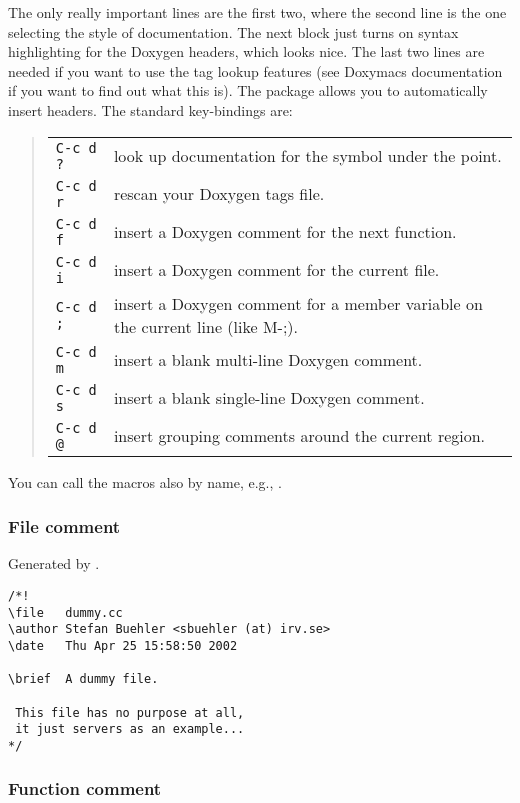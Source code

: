 The only really important lines are the first two, where the second
line is the one selecting the style of documentation. The next block
just turns on syntax highlighting for the Doxygen headers, which looks
nice. The last two lines are needed if you want to use the tag lookup
features (see Doxymacs documentation if you want to find out what this
is).  The package allows you to automatically insert headers. The
standard key-bindings are:
\begin{quote}
\begin{tabularx}{.8\hsize}{@{}lX}
\texttt{C-c d ?} & look up documentation for the symbol under the point.\\
\texttt{C-c d r} & rescan your Doxygen tags file.\\
\texttt{C-c d f} & insert a Doxygen comment for the next function.\\
\texttt{C-c d i} & insert a Doxygen comment for the current file.\\
\texttt{C-c d ;} & insert a Doxygen comment for a member variable on the current line (like M-;).\\
\texttt{C-c d m} & insert a blank multi-line Doxygen comment.\\
\texttt{C-c d s} & insert a blank single-line Doxygen comment.\\
\texttt{C-c d @} & insert grouping comments around the current region.\\
\end{tabularx}
\end{quote}
You can call the macros also by name, e.g., .

\subsubsection{File comment}

Generated by .

\begin{verbatim}
/*!
\file   dummy.cc
\author Stefan Buehler <sbuehler (at) irv.se>
\date   Thu Apr 25 15:58:50 2002

\brief  A dummy file.

 This file has no purpose at all,
 it just servers as an example... 
*/
\end{verbatim}

\subsubsection{Function comment}

